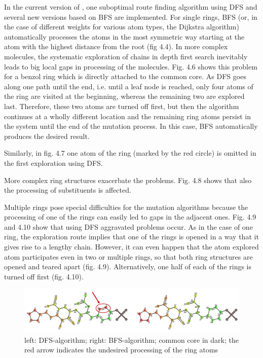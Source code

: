 In the current version of {\trafo}, one suboptimal route finding algorithm using DFS and several new versions based on BFS are implemented.
For single rings, BFS (or, in the case of different weights for various atom types, the Dijkstra algorithm) automatically processes the atoms in the most symmetric way starting at the atom with the highest distance from the root (fig 4.4).
In more complex molecules, the systematic exploration of chains in
depth first search inevitably leads to big local gaps in processing
of the molecules. Fig. 4.6 shows this problem for a benzol ring which
is directly attached to the common core. As DFS goes along one path
until the end, i.e. until a leaf node is reached, only four atoms of the
ring are visited at the beginning, whereas the remaining two are explored
last. Therefore, these two atoms are turned off first, but then the
algorithm continues at a wholly different location and the remaining
ring atoms persist in the system until the end of the mutation process.
In this case, BFS automatically produces the desired result. 

Similarly, in fig. 4.7 one atom of the ring (marked by the red circle)
is omitted in the first exploration using DFS.

More complex ring structures exacerbate the problems. Fig. 4.8 shows that also the processing of substituents is affected.

Multiple rings pose special difficulties for the mutation algorithms because
the processing of one of the rings can easily led to gaps in the adjacent
ones. Fig. 4.9 and 4.10 show that using DFS aggravated problems occur.
As in the case of one ring, the exploration route implies that one
of the rings is opened in a way that it gives rise to a lengthy chain.
However, it can even happen that the atom explored atom participates
even in two or multiple rings, so that both ring structures are opened
and teared apart (fig. 4.9). Alternatively, one half of each of the
rings is turned off first (fig. 4.10). 

\begin{figure}
\includegraphics[scale=1.5]{simple_ring_exampledfs2}\caption{left: DFS-algorithm; right: BFS-algorithm; common core in dark; the
red arrow indicates the undesired processing of the ring atoms}

\end{figure}

